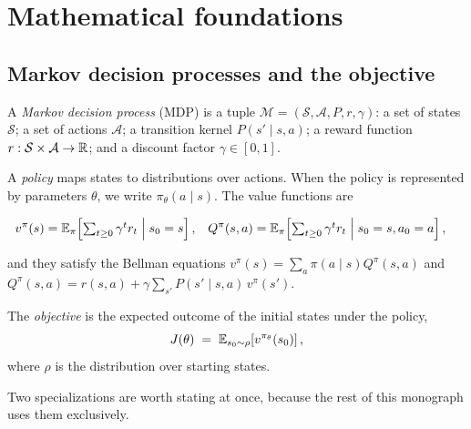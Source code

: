 \section{Mathematical foundations}
\label{sec:foundations}

\subsection{Markov decision processes and the objective}
\label{sec:mdp}

\begin{definition}
A \emph{Markov decision process} (MDP) is a tuple
$\mathcal{M} = (\mathcal{S}, \mathcal{A}, P, r, \gamma)$: a set of states
$\mathcal{S}$; a set of actions $\mathcal{A}$; a transition kernel
$P(s' \mid s,a)$; a reward function $r : \mathcal{S} \times \mathcal{A} \to \mathbb{R}$;
and a discount factor $\gamma \in [0,1]$.
\end{definition}

A \emph{policy} maps states to distributions over actions. When the policy is
represented by parameters $\theta$, we write $\pi_\theta(a \mid s)$. The value
functions are

\begin{align}
v^{\pi}(s) &= \mathbb{E}_{\pi}\!\left[\textstyle\sum_{t \ge 0} \gamma^t r_t
\;\middle|\; s_0 = s\right], &
Q^{\pi}(s,a) &= \mathbb{E}_{\pi}\!\left[\textstyle\sum_{t \ge 0} \gamma^t r_t
\;\middle|\; s_0 = s, a_0 = a\right],
\end{align}

and they satisfy the Bellman equations
$v^\pi(s) = \sum_a \pi(a\mid s) Q^\pi(s,a)$ and
$Q^\pi(s,a) = r(s,a) + \gamma \sum_{s'} P(s'\mid s,a)\, v^\pi(s')$.

The \emph{objective} is the expected outcome of the initial states under the
policy,
\begin{equation}
J(\theta) \;=\; \mathbb{E}_{s_0 \sim \rho}\!\left[ v^{\pi_\theta}(s_0) \right],
\label{eq:objective}
\end{equation}
where $\rho$ is the distribution over starting states.

Two specializations are worth stating at once, because the rest of this
monograph uses them exclusively.

